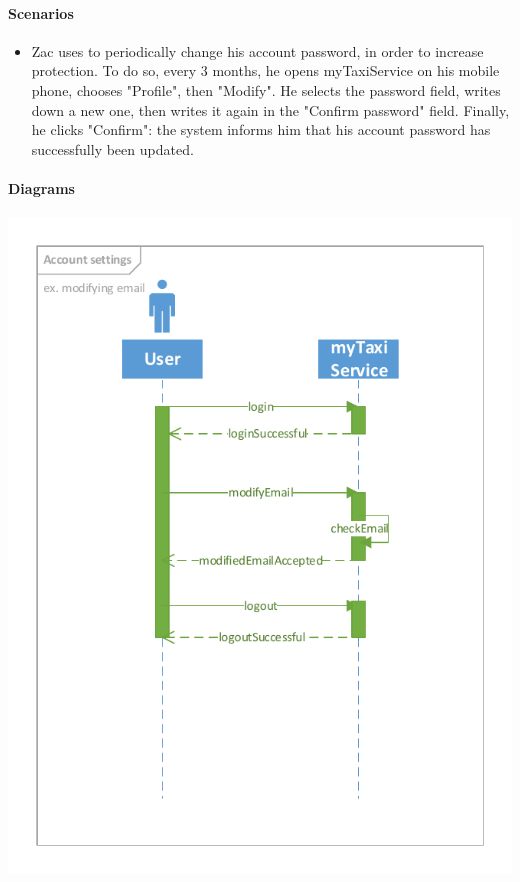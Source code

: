 	\paragraph{Scenarios}
		\begin{itemize}
			\item Zac uses to periodically change his account password, in order to increase protection. To do so, every 3 months, he opens myTaxiService on his mobile phone, chooses "Profile", then "Modify". He selects the password field, writes down a new one, then writes it again in the "Confirm password" field. Finally, he clicks "Confirm": the system informs him that his account password has successfully been updated.
		\end{itemize}
	
	\paragraph{Diagrams}
		\begin{center}
			\includegraphics[width=\textwidth]{diagrams/account_settings}
		\end{center}
